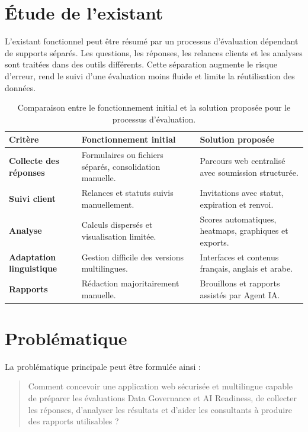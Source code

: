 \documentclass[12pt,a4paper]{report}
\begin{document}
\section{Étude de l'existant}
L'existant fonctionnel peut être résumé par un processus d'évaluation dépendant de supports séparés. Les questions, les réponses, les relances clients et les analyses sont traitées dans des outils différents. Cette séparation augmente le risque d'erreur, rend le suivi d'une évaluation moins fluide et limite la réutilisation des données.

\begin{table}[H]
\centering
\caption{Comparaison entre le fonctionnement initial et la solution proposée pour le processus d'évaluation.}
\small
\begin{tabularx}{\textwidth}{>{\bfseries}L{3.5cm}Y Y}
\toprule
Critère & Fonctionnement initial & Solution proposée \\
\midrule
Collecte des réponses & Formulaires ou fichiers séparés, consolidation manuelle. & Parcours web centralisé avec soumission structurée. \\
Suivi client & Relances et statuts suivis manuellement. & Invitations avec statut, expiration et renvoi. \\
Analyse & Calculs dispersés et visualisation limitée. & Scores automatiques, heatmaps, graphiques et exports. \\
Adaptation linguistique & Gestion difficile des versions multilingues. & Interfaces et contenus français, anglais et arabe. \\
Rapports & Rédaction majoritairement manuelle. & Brouillons et rapports assistés par Agent IA. \\
\bottomrule
\end{tabularx}
\label{tab:existant}
\end{table}

\section{Problématique}
La problématique principale peut être formulée ainsi :

\begin{quote}
Comment concevoir une application web sécurisée et multilingue capable de préparer les évaluations Data Governance et AI Readiness, de collecter les réponses, d'analyser les résultats et d'aider les consultants à produire des rapports utilisables ?
\end{quote}
\end{document}
